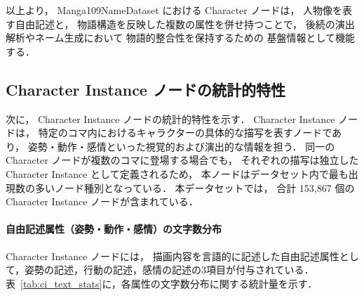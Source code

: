 \documentclass[a4j,12pt,dvipdfmx]{jsreport}
\begin{document}
以上より，
Manga109NameDataset における Character ノードは，
人物像を表す自由記述と，
物語構造を反映した複数の属性を併せ持つことで，
後続の演出解析やネーム生成において
物語的整合性を保持するための
基盤情報として機能する．

\subsection{Character Instance ノードの統計的特性}
\label{sec:character_instance_node_stats}
次に，
Character Instance ノードの統計的特性を示す．
Character Instance ノードは，
特定のコマ内におけるキャラクターの具体的な描写を表すノードであり，
姿勢・動作・感情といった視覚的および演出的な情報を担う．
同一の Character ノードが複数のコマに登場する場合でも，
それぞれの描写は独立した Character Instance として定義されるため，
本ノードはデータセット内で最も出現数の多いノード種別となっている．
本データセットでは，
合計 153{,}867 個の Character Instance ノードが含まれている．

\paragraph{自由記述属性（姿勢・動作・感情）の文字数分布}
Character Instance ノードには，
描画内容を言語的に記述した自由記述属性として，姿勢の記述，行動の記述，感情の記述の3項目が付与されている．表~\ref{tab:ci_text_stats}に，各属性の文字数分布に関する統計量を示す．
\end{document}
